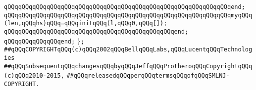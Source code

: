 \verb|qQQqqQQqqQQqqQQqqQQqqQQqqQQqqQQqqQQqqQQqqQQqqQQqqQQqqQQqqQQqqQQqend;|\newline
\newline
\verb|qQQqqQQqqQQqqQQqqQQqqQQqqQQqqQQqqQQqqQQqqQQqqQQqqQQqqQQqqQQqqQQqmyqQQq(len,qQQqhs)qQQq=qQQqinitqQQq(l,qQQq0,qQQq[]);|\newline
\newline
\verb|qQQqqQQqqQQqqQQqqQQqqQQqqQQqqQQqqQQqqQQqqQQqqQQqend;|\newline
\verb|qQQqqQQqqQQqqQQqend;|\newline
\verb|};|\newline
\newline
\newline
\newline
\verb|##qQQqCOPYRIGHTqQQq(c)qQQq2002qQQqBellqQQqLabs,qQQqLucentqQQqTechnologies|\newline
\verb|##qQQqSubsequentqQQqchangesqQQqbyqQQqJeffqQQqProtheroqQQqCopyrightqQQq(c)qQQq2010-2015,|\newline
\verb|##qQQqreleasedqQQqperqQQqtermsqQQqofqQQqSMLNJ-COPYRIGHT.|\newline

